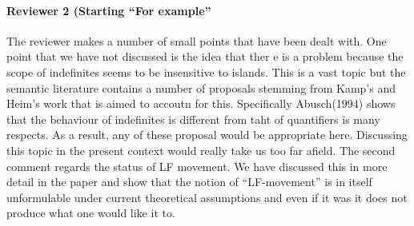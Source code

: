 \documentclass[11pt]{article}
\begin{document}
\paragraph{Reviewer 2 (Starting ``For example''}  The reviewer makes a number of small points that have been dealt with.  One point that we have not discussed is the idea that ther e is a problem because the scope of indefinites seems to be insensitive to islands.  This is a vast topic but the semantic literature contains a number of proposals stemming from Kamp's and Heim's work that is aimed to accoutn for this.  Specifically Abusch(1994) shows that the behaviour of indefinites is different from taht of quantifiers is many respects.  As a result, any of these proposal would be appropriate here.  Discussing this topic in the present context would really take us too far afield.
The second comment regards the status of LF movement.  We have discussed this in more detail in the paper and show that the notion of ``LF-movement'' is in itself unformulable under current theoretical assumptions and even if it was it does not produce what one would like it to.
\end{document}
